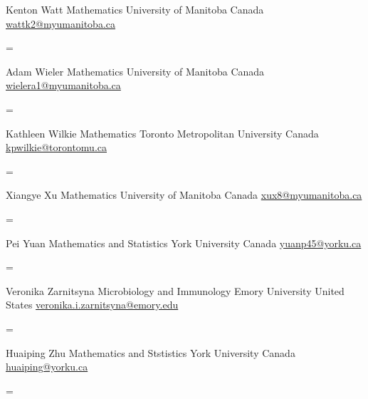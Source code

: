 \documentclass[
  letterpaper,
  DIV=11,
  numbers=noendperiod]{scrartcl}
\newenvironment{absolutelynopagebreak}
  {\par\nobreak\vfil\penalty0\vfilneg
   \vtop\bgroup}
  {\par\xdef\tpd{\the\prevdepth}\egroup
   \prevdepth=\tpd}
\begin{document}
\begin{absolutelynopagebreak}Kenton   Watt \newline
\mbox{}\quad  Mathematics \newline
\mbox{}\quad  University of Manitoba \newline
\mbox{}\quad  Canada \newline
\mbox{}\quad \href{mailto: wattk2@myumanitoba.ca }{ wattk2@myumanitoba.ca }
\end{absolutelynopagebreak}\vskip0.2cm
\begin{absolutelynopagebreak}Adam   Wieler \newline
\mbox{}\quad  Mathematics \newline
\mbox{}\quad  University of Manitoba \newline
\mbox{}\quad  Canada \newline
\mbox{}\quad \href{mailto: wielera1@myumanitoba.ca }{ wielera1@myumanitoba.ca }
\end{absolutelynopagebreak}\vskip0.2cm
\begin{absolutelynopagebreak}Kathleen   Wilkie \newline
\mbox{}\quad  Mathematics \newline
\mbox{}\quad  Toronto Metropolitan University \newline
\mbox{}\quad  Canada \newline
\mbox{}\quad \href{mailto: kpwilkie@torontomu.ca }{ kpwilkie@torontomu.ca }
\end{absolutelynopagebreak}\vskip0.2cm
\begin{absolutelynopagebreak}Xiangye   Xu \newline
\mbox{}\quad  Mathematics \newline
\mbox{}\quad  University of Manitoba \newline
\mbox{}\quad  Canada \newline
\mbox{}\quad \href{mailto: xux8@myumanitoba.ca }{ xux8@myumanitoba.ca }
\end{absolutelynopagebreak}\vskip0.2cm
\begin{absolutelynopagebreak}Pei   Yuan \newline
\mbox{}\quad  Mathematics and Statistics \newline
\mbox{}\quad  York University \newline
\mbox{}\quad  Canada \newline
\mbox{}\quad \href{mailto: yuanp45@yorku.ca }{ yuanp45@yorku.ca }
\end{absolutelynopagebreak}\vskip0.2cm
\begin{absolutelynopagebreak}Veronika   Zarnitsyna \newline
\mbox{}\quad  Microbiology and Immunology \newline
\mbox{}\quad  Emory University \newline
\mbox{}\quad  United States \newline
\mbox{}\quad \href{mailto: veronika.i.zarnitsyna@emory.edu }{ veronika.i.zarnitsyna@emory.edu }
\end{absolutelynopagebreak}\vskip0.2cm
\begin{absolutelynopagebreak}Huaiping   Zhu \newline
\mbox{}\quad  Mathematics and Ststistics \newline
\mbox{}\quad  York University \newline
\mbox{}\quad  Canada \newline
\mbox{}\quad \href{mailto: huaiping@yorku.ca }{ huaiping@yorku.ca }
\end{absolutelynopagebreak}\vskip0.2cm
\end{document}
